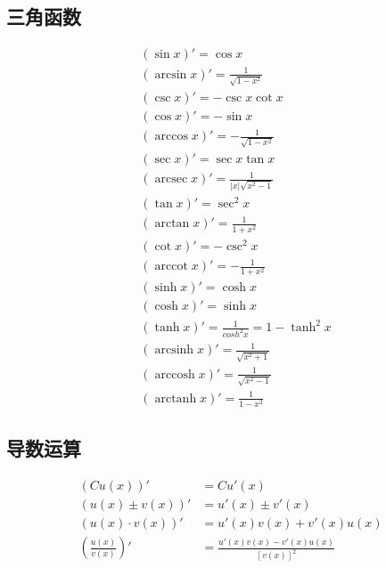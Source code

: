 \subsection{三角函数}
\vspace{-10mm}
\begin{align}
&(\sin x)' = \cos x \label{derivative_sin}\\
&(\arcsin x)' = \frac{1}{\sqrt{1-x^2}} \label{derivative_arcsin}\\
&(\csc x)' = -\csc x\cot x \label{derivative_csc}\\
&(\cos x)' = -\sin x \label{derivative_cos}\\
&(\arccos x)' = -\frac{1}{\sqrt{1-x^2}} \label{derivative_arccos}\\
&(\sec x)' = \sec x\tan x \label{derivative_sec}\\
&(\operatorname{arcsec}{x})'=\frac{1}{\left|x\right|\sqrt{x^2-1}} \label{derivative_arcsec}\\
&(\tan x)' = \sec^2x \label{derivative_tan}\\
&(\arctan x)' = \frac{1}{1+x^2} \label{derivative_arctan}\\
&(\cot x)' = -\csc^2x \label{derivative_cot}\\
&(\operatorname{arccot}{x})' = -\frac{1}{1+x^2}\label{derivative_arccot}\\
&(\sinh x)' = \cosh x \label{derivative_sinh}\\
&(\cosh x)' = \sinh x \label{derivative_cosh}\\
&(\tanh x)' = \frac{1}{cosh^2 x}=1-\tanh^2x \label{derivative_tanh}\\
&(\operatorname{arcsinh}{x})' =\frac{1}{\sqrt{x^2+1}} \label{derivative_arcsinh}\\
&(\operatorname{arccosh}{x})'=\frac{1}{\sqrt{x^2-1}} \label{derivative_arccosh}\\
&(\operatorname{arctanh}{x})'=\frac{1}{1-x^2} \label{derivative_arctanh}
\end{align}
\subsection{导数运算}
\begin{center}
\end{center}
\begin{align}
  (Cu(x))'&= Cu'(x)\label{limit_operation_1}\\
  (u(x)\pm v(x))'&=u'(x)\pm v'(x)\label{limit_operation_2}\\
  (u(x)\cdotp v(x))'&=u'(x)v(x)+v'(x)u(x)\label{limit_operation_3}\\
  \left(\frac{u(x)}{v(x)}\right)'&=\frac{u'(x)v(x)-v'(x)u(x)}{\left[v(x)\right]^2}\label{limit_operation_4}
\end{align}
